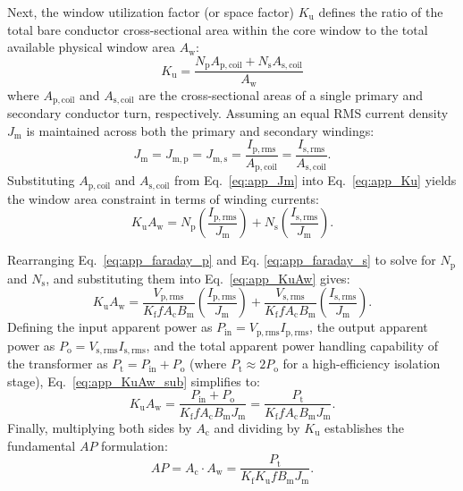 Next, the window utilization factor (or space factor) $K_{\mathrm{u}}$ defines the ratio of the total bare conductor cross-sectional area within the core window to the total available physical window area $A_{\mathrm{w}}$:
\begin{equation}
    K_{\mathrm{u}} = \frac{N_{\mathrm{p}} A_{\mathrm{p,coil}} + N_{\mathrm{s}} A_{\mathrm{s,coil}}}{A_{\mathrm{w}}} \label{eq:app_Ku}
\end{equation}
where $A_{\mathrm{p,coil}}$ and $A_{\mathrm{s,coil}}$ are the cross-sectional areas of a single primary and secondary conductor turn, respectively. Assuming an equal RMS current density $J_{\mathrm{m}}$ is maintained across both the primary and secondary windings:
\begin{equation}
    J_{\mathrm{m}} = J_{\mathrm{m,p}} = J_{\mathrm{m,s}} = \frac{I_{\mathrm{p,rms}}}{A_{\mathrm{p,coil}}} = \frac{I_{\mathrm{s,rms}}}{A_{\mathrm{s,coil}}}. \label{eq:app_Jm}
\end{equation}
Substituting $A_{\mathrm{p,coil}}$ and $A_{\mathrm{s,coil}}$ from Eq.~\ref{eq:app_Jm} into Eq.~\ref{eq:app_Ku} yields the window area constraint in terms of winding currents:
\begin{equation}
    K_{\mathrm{u}} A_{\mathrm{w}} = N_{\mathrm{p}} \left( \frac{I_{\mathrm{p,rms}}}{J_{\mathrm{m}}} \right) + N_{\mathrm{s}} \left( \frac{I_{\mathrm{s,rms}}}{J_{\mathrm{m}}} \right). \label{eq:app_KuAw}
\end{equation}

Rearranging Eq.~\ref{eq:app_faraday_p} and Eq. \ref{eq:app_faraday_s} to solve for $N_{\mathrm{p}}$ and $N_{\mathrm{s}}$, and substituting them into Eq.~\ref{eq:app_KuAw} gives:
\begin{equation}
    K_{\mathrm{u}} A_{\mathrm{w}} = \frac{V_{\mathrm{p,rms}}}{K_{\mathrm{f}} f A_{\mathrm{c}} B_{\mathrm{m}}} \left( \frac{I_{\mathrm{p,rms}}}{J_{\mathrm{m}}} \right) + \frac{V_{\mathrm{s,rms}}}{K_{\mathrm{f}} f A_{\mathrm{c}} B_{\mathrm{m}}} \left( \frac{I_{\mathrm{s,rms}}}{J_{\mathrm{m}}} \right). \label{eq:app_KuAw_sub}
\end{equation}
Defining the input apparent power as $P_{\mathrm{in}} = V_{\mathrm{p,rms}} I_{\mathrm{p,rms}}$, the output apparent power as $P_{\mathrm{o}} = V_{\mathrm{s,rms}} I_{\mathrm{s,rms}}$, and the total apparent power handling capability of the transformer as $P_{\mathrm{t}} = P_{\mathrm{in}} + P_{\mathrm{o}}$ (where $P_{\mathrm{t}} \approx 2P_{\mathrm{o}}$ for a high-efficiency isolation stage), Eq.~\ref{eq:app_KuAw_sub} simplifies to:
\begin{equation}
    K_{\mathrm{u}} A_{\mathrm{w}} = \frac{P_{\mathrm{in}} + P_{\mathrm{o}}}{K_{\mathrm{f}} f A_{\mathrm{c}} B_{\mathrm{m}} J_{\mathrm{m}}} = \frac{P_{\mathrm{t}}}{K_{\mathrm{f}} f A_{\mathrm{c}} B_{\mathrm{m}} J_{\mathrm{m}}}. \label{eq:app_Pt}
\end{equation}
Finally, multiplying both sides by $A_{\mathrm{c}}$ and dividing by $K_{\mathrm{u}}$ establishes the fundamental $AP$ formulation:
\begin{equation}
    AP = A_{\mathrm{c}} \cdot A_{\mathrm{w}} = \frac{P_{\mathrm{t}}}{K_{\mathrm{f}} K_{\mathrm{u}} f B_{\mathrm{m}} J_{\mathrm{m}}}. \label{eq:app_AP_final}
\end{equation}

